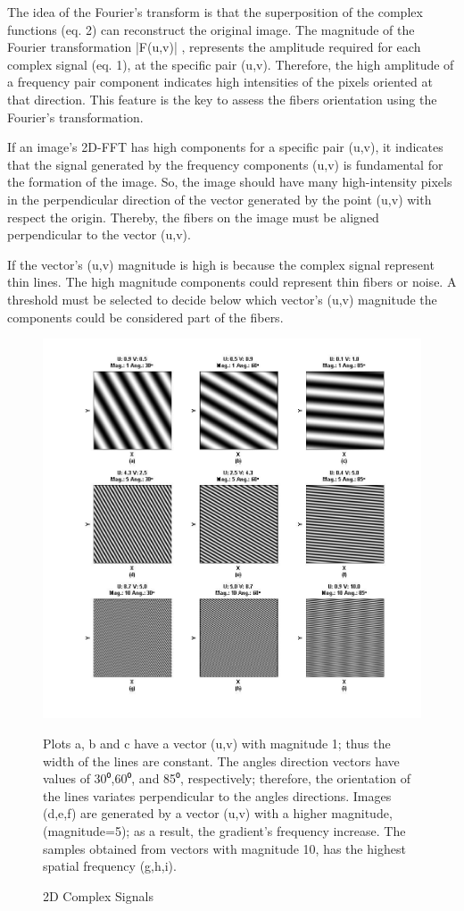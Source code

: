 \documentclass[12pt,a4paper]{article}
\begin{document}
The idea of the Fourier's transform is that the superposition of the complex functions (eq. 2) can reconstruct the original image. The magnitude of the Fourier transformation |F(u,v)| , represents  the amplitude required for each complex signal (eq. 1), at the specific pair (u,v). Therefore, the high amplitude of a frequency pair component indicates high intensities of the pixels oriented at that direction. This feature is the key to assess the fibers orientation using the Fourier’s transformation. 

If an image's 2D-FFT has high components for a specific pair (u,v),  it indicates that the signal generated by the frequency components (u,v)  is fundamental for the formation of the image. So, the image should have many high-intensity pixels in the perpendicular direction of the vector generated by the point (u,v) with respect the origin. Thereby, the fibers on the image must be aligned perpendicular to the vector (u,v).

If the vector's (u,v) magnitude is high is because the complex signal represent thin lines. The high magnitude components could represent thin fibers or noise. A threshold must be selected to decide below which vector's (u,v) magnitude the components could be considered part of the fibers.

\begin{figure}
  \includegraphics[width=\linewidth]{FiguresDisertation/figure1.jpg}
  \caption{2D Complex Signals}
  \medskip
  \small
  Plots a, b and c have a vector (u,v) with magnitude 1; thus the width of the lines are constant. The angles direction vectors have values of 30⁰,60⁰, and 85⁰, respectively; therefore, the orientation of the lines variates perpendicular to the angles directions. Images (d,e,f) are generated by a vector (u,v)  with a higher magnitude,(magnitude=5); as a result, the gradient's frequency increase. The samples obtained from vectors with magnitude 10, has the highest spatial frequency (g,h,i).
\end{figure}
\end{document}
